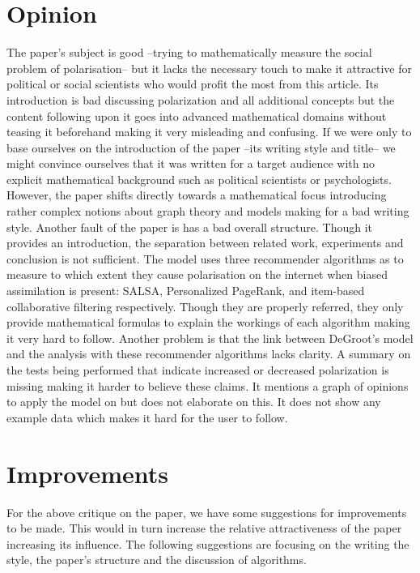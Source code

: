 \documentclass[14]{article}
\begin{document}
\section{Opinion}
The paper's subject is good --trying to mathematically measure the social problem of polarisation-- but it lacks the necessary touch to make it attractive for political or social scientists who would profit the most from this article. Its introduction is bad discussing polarization and all additional concepts but the content following upon it goes into advanced mathematical domains without teasing it beforehand making it very misleading and confusing.
\newline
If we were only to base ourselves on the introduction of the paper --its writing style and title-- we might convince ourselves that it was written for a target audience with no explicit mathematical background such as political scientists or psychologists. However, the paper shifts directly towards a mathematical focus introducing rather complex notions about graph theory and models making for a bad writing style.
Another fault of the paper is has a bad overall structure. Though it provides an introduction, the separation between related work, experiments and conclusion is not sufficient. 
\newline
The model uses three recommender algorithms as to measure to which extent they cause polarisation on the internet when biased assimilation is present: SALSA\cite{lempel2001salsa}, Personalized PageRank\cite{page1999pagerank}, and item-based collaborative filtering\cite{linden2003amazon} respectively. Though they are properly referred, they only provide mathematical formulas to explain the workings of each algorithm making it very hard to follow. Another problem is that the link between DeGroot's model and the analysis with these recommender algorithms lacks clarity. A summary on the tests being performed that indicate increased or decreased polarization is missing making it harder to believe these claims. It mentions a graph of opinions to apply the model on but does not elaborate on this. It does not show any example data which makes it hard for the user to follow. 

\section{Improvements}
For the above critique on the paper, we have some suggestions for improvements to be made. This would in turn increase the relative attractiveness of the paper increasing its influence. The following suggestions are focusing on the writing the style, the paper's structure and the discussion of algorithms.
\end{document}
